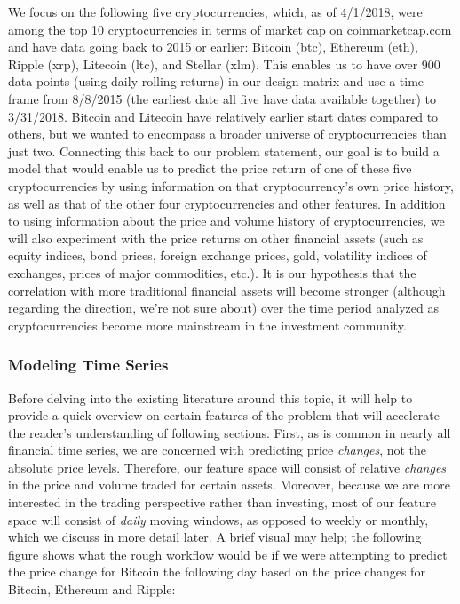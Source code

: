 \documentclass[12pt,twoside]{article}
\begin{document}
We focus on the following five cryptocurrencies, which, as of 4/1/2018, were among the top 10 cryptocurrencies in terms of market cap on coinmarketcap.com and have data going back to 2015 or earlier: Bitcoin (btc), Ethereum (eth), Ripple (xrp), Litecoin (ltc), and Stellar (xlm). This enables us to have over 900 data points (using daily rolling returns) in our design matrix and use a time frame from 8/8/2015 (the earliest date all five have data available together) to 3/31/2018. Bitcoin and Litecoin have relatively earlier start dates compared to others, but we wanted to encompass a broader universe of cryptocurrencies than just two. Connecting this back to our problem statement, our goal is to build a model that would enable us to predict the price return of one of these five cryptocurrencies by using information on that cryptocurrency's own price history, as well as that of the other four cryptocurrencies and other features.
\bigbreak
In addition to using information about the price and volume history of cryptocurrencies, we will also experiment with the price returns on other financial assets (such as equity indices, bond prices, foreign exchange prices, gold, volatility indices of exchanges, prices of major commodities, etc.). It is our hypothesis that the correlation with more traditional financial assets will become stronger (although regarding the direction, we’re not sure about) over the time period analyzed as cryptocurrencies become more mainstream in the investment community.
\subsubsection{Modeling Time Series}
Before delving into the existing literature around this topic, it will help to provide a quick overview on certain features of the problem that will accelerate the reader's understanding of following sections. First, as is common in nearly all financial time series, we are concerned with predicting price \textit{changes}, not the absolute price levels. Therefore, our feature space will consist of relative \textit{changes} in the price and volume traded for certain assets. Moreover, because we are more interested in the trading perspective rather than investing, most of our feature space will consist of \textit{daily} moving windows, as opposed to weekly or monthly, which we discuss in more detail later. A brief visual may help; the following figure shows what the rough workflow would be if we were attempting to predict the price change for Bitcoin the following day based on the price changes for Bitcoin, Ethereum and Ripple:
\end{document}
